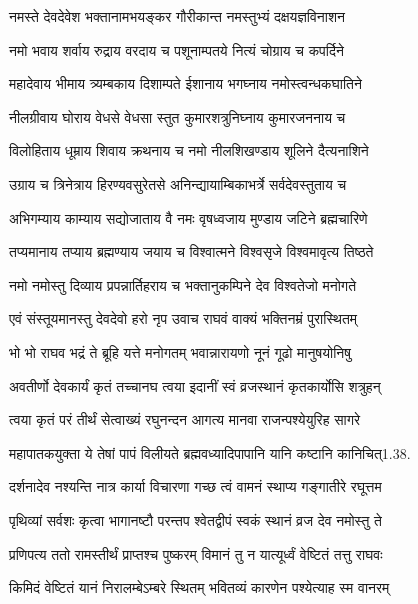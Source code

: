 
\twolineshloka
{नमस्ते देवदेवेश भक्तानामभयङ्कर}
{गौरीकान्त नमस्तुभ्यं दक्षयज्ञविनाशन}%

\twolineshloka
{नमो भवाय शर्वाय रुद्राय वरदाय च}
{पशूनाम्पतये नित्यं चोग्राय च कपर्दिने}%

\twolineshloka
{महादेवाय भीमाय त्र्यम्बकाय दिशाम्पते}
{ईशानाय भगघ्नाय नमोस्त्वन्धकघातिने}%

\twolineshloka
{नीलग्रीवाय घोराय वेधसे वेधसा स्तुत}
{कुमारशत्रुनिघ्नाय कुमारजननाय च}%

\twolineshloka
{विलोहिताय धूम्राय शिवाय क्रथनाय च}
{नमो नीलशिखण्डाय शूलिने दैत्यनाशिने}%

\twolineshloka
{उग्राय च त्रिनेत्राय हिरण्यवसुरेतसे}
{अनिन्द्यायाम्बिकाभर्त्रे सर्वदेवस्तुताय च}%

\twolineshloka
{अभिगम्याय काम्याय सद्योजाताय वै नमः}
{वृषध्वजाय मुण्डाय जटिने ब्रह्मचारिणे}%

\twolineshloka
{तप्यमानाय तप्याय ब्रह्मण्याय जयाय च}
{विश्वात्मने विश्वसृजे विश्वमावृत्य तिष्ठते}%

\twolineshloka
{नमो नमोस्तु दिव्याय प्रपन्नार्तिहराय च}
{भक्तानुकम्पिने देव विश्वतेजो मनोगते}%


\twolineshloka
{एवं संस्तूयमानस्तु देवदेवो हरो नृप}
{उवाच राघवं वाक्यं भक्तिनम्रं पुरास्थितम्}%


\twolineshloka
{भो भो राघव भद्रं ते ब्रूहि यत्ते मनोगतम्}
{भवान्नारायणो नूनं गूढो मानुषयोनिषु}%

\twolineshloka
{अवतीर्णो देवकार्यं कृतं तच्चानघ त्वया}
{इदानीं स्वं व्रजस्थानं कृतकार्योसि शत्रुहन्}%

\twolineshloka
{त्वया कृतं परं तीर्थं सेत्वाख्यं रघुनन्दन}
{आगत्य मानवा राजन्पश्येयुरिह सागरे}%

\twolineshloka
{महापातकयुक्ता ये तेषां पापं विलीयते}
{ब्रह्मवध्यादिपापानि यानि कष्टानि कानिचित्1.38.}%

\twolineshloka
{दर्शनादेव नश्यन्ति नात्र कार्या विचारणा}
{गच्छ त्वं वामनं स्थाप्य गङ्गातीरे रघूत्तम}%

\twolineshloka
{पृथिव्यां सर्वशः कृत्वा भागानष्टौ परन्तप}
{श्वेतद्वीपं स्वकं स्थानं व्रज देव नमोस्तु ते}%

\twolineshloka
{प्रणिपत्य ततो रामस्तीर्थं प्राप्तश्च पुष्करम्}
{विमानं तु न यात्यूर्ध्वं वेष्टितं तत्तु राघवः}%

\twolineshloka
{किमिदं वेष्टितं यानं निरालम्बेऽम्बरे स्थितम्}
{भवितव्यं कारणेन पश्येत्याह स्म वानरम्}%

